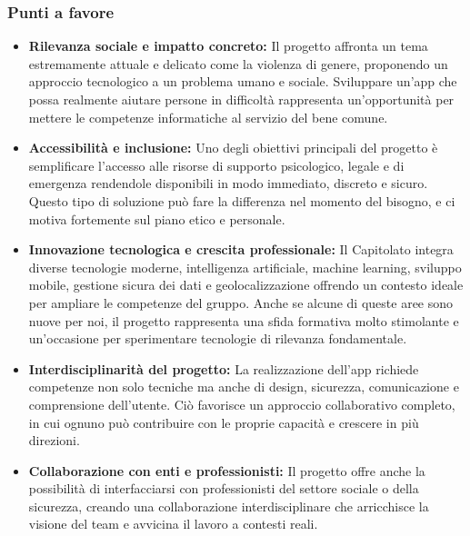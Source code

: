 \documentclass[a4paper,12pt]{article}
\begin{document}
\subsubsection{Punti a favore}
\begin{itemize}
    \item \textbf{Rilevanza sociale e impatto concreto:} Il progetto affronta un tema estremamente attuale e delicato come la violenza di genere, proponendo un approccio tecnologico a un problema umano e sociale. Sviluppare un’app che possa realmente aiutare persone in difficoltà rappresenta un’opportunità per mettere le competenze informatiche al servizio del bene comune.
    \item \textbf{Accessibilità e inclusione:} Uno degli obiettivi principali del progetto è semplificare l’accesso alle risorse di supporto psicologico, legale e di emergenza rendendole disponibili in modo immediato, discreto e sicuro. Questo tipo di soluzione può fare la differenza nel momento del bisogno, e ci motiva fortemente sul piano etico e personale.
    \item \textbf{Innovazione tecnologica e crescita professionale:} Il Capitolato integra diverse tecnologie moderne, intelligenza artificiale, machine learning, sviluppo mobile, gestione sicura dei dati e geolocalizzazione offrendo un contesto ideale per ampliare le competenze del gruppo. Anche se alcune di queste aree sono nuove per noi, il progetto rappresenta una sfida formativa molto stimolante e un’occasione per sperimentare tecnologie di rilevanza fondamentale.
    \item \textbf{Interdisciplinarità del progetto:} La realizzazione dell’app richiede competenze non solo tecniche ma anche di design, sicurezza, comunicazione e comprensione dell’utente. Ciò favorisce un approccio collaborativo completo, in cui ognuno può contribuire con le proprie capacità e crescere in più direzioni.
    \item \textbf{Collaborazione con enti e professionisti:} Il progetto offre anche la possibilità di interfacciarsi con professionisti del settore sociale o della sicurezza, creando una collaborazione interdisciplinare che arricchisce la visione del team e avvicina il lavoro a contesti reali.
\end{itemize}
\end{document}
